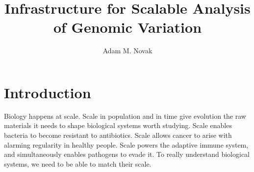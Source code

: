 \documentclass[11pt,proposal]{ucthesis}
\begin{document}
\newcommand{\vocab}[1]{\textbf{#1}}


\title{Infrastructure for Scalable Analysis of Genomic Variation}
\author{Adam M. Novak}
\deanlinethree{}

\begin{frontmatter}

\maketitle
\copyrightpage

\tableofcontents
\listoffigures
\listoftables

\begin{abstract}

\end{abstract}

\begin{acknowledgements}

\end{acknowledgements}

\end{frontmatter}

\chapter{Introduction}

Biology happens at scale. Scale in population and in time give evolution the raw materials it needs to shape biological systems worth studying. Scale enables bacteria to become resistant to antibiotics. Scale allows cancer to arise with alarming regularity in healthy people. Scale powers the adaptive immune system, and simultaneously enables pathogens to evade it. To really understand biological systems, we need to be able to match their scale.
\end{document}
